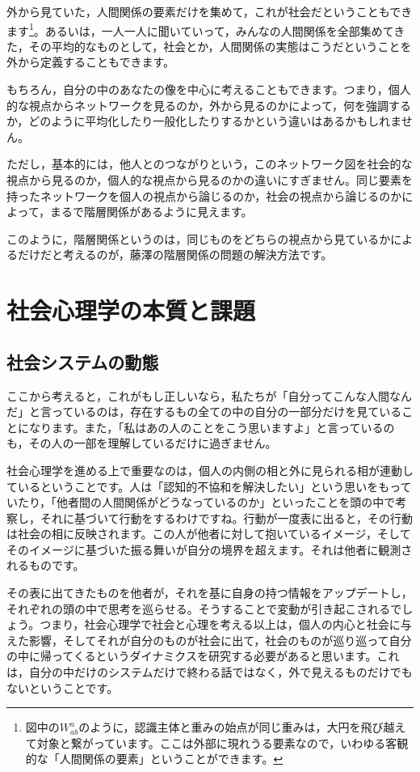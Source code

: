 \documentclass{ltjsbook}
\begin{document}
外から見ていた，人間関係の要素だけを集めて，これが社会だということもできます\footnote{図中の$W_{ab}^{a}$のように，認識主体と重みの始点が同じ重みは，大円を飛び越えて対象と繋がっています。ここは外部に現れうる要素なので，いわゆる客観的な「人間関係の要素」ということができます。}。あるいは，一人一人に聞いていって，みんなの人間関係を全部集めてきた，その平均的なものとして，社会とか，人間関係の実態はこうだということを外から定義することもできます。

もちろん，自分の中のあなたの像を中心に考えることもできます。つまり，個人的な視点からネットワークを見るのか，外から見るのかによって，何を強調するか，どのように平均化したり一般化したりするかという違いはあるかもしれません。

ただし，基本的には，他人とのつながりという，このネットワーク図を社会的な視点から見るのか，個人的な視点から見るのかの違いにすぎません。同じ要素を持ったネットワークを個人の視点から論じるのか，社会の視点から論じるのかによって，まるで階層関係があるように見えます。

このように，階層関係というのは，同じものをどちらの視点から見ているかによるだけだと考えるのが，藤澤の階層関係の問題の解決方法です。

\section{社会心理学の本質と課題}
\subsection{社会システムの動態}
ここから考えると，これがもし正しいなら，私たちが「自分ってこんな人間なんだ」と言っているのは，存在するもの全ての中の自分の一部分だけを見ていることになります。また，「私はあの人のことをこう思いますよ」と言っているのも，その人の一部を理解しているだけに過ぎません。

社会心理学を進める上で重要なのは，個人の内側の相と外に見られる相が連動しているということです。人は「認知的不協和を解決したい」という思いをもっていたり，「他者間の人間関係がどうなっているのか」といったことを頭の中で考察し，それに基づいて行動をするわけですね。行動が一度表に出ると，その行動は社会の相に反映されます。この人が他者に対して抱いているイメージ，そしてそのイメージに基づいた振る舞いが自分の境界を超えます。それは他者に観測されるものです。

その表に出てきたものを他者が，それを基に自身の持つ情報をアップデートし，それぞれの頭の中で思考を巡らせる。そうすることで変動が引き起こされるでしょう。つまり，社会心理学で社会と心理を考える以上は，個人の内心と社会に与えた影響，そしてそれが自分のものが社会に出て，社会のものが巡り巡って自分の中に帰ってくるというダイナミクスを研究する必要があると思います。これは，自分の中だけのシステムだけで終わる話ではなく，外で見えるものだけでもないということです。
\end{document}
